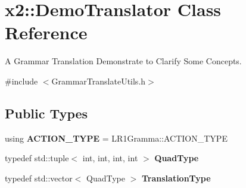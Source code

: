 \hypertarget{classx2_1_1_demo_translator}{}\section{x2\+:\+:Demo\+Translator Class Reference}
\label{classx2_1_1_demo_translator}


A Grammar Translation Demonstrate to Clarify Some Concepts.  




{\ttfamily \#include $<$Grammar\+Translate\+Utils.\+h$>$}

\subsection*{Public Types}
\begin{DoxyCompactItemize}
\item 
\mbox{\label{classx2_1_1_demo_translator_a353f41b11b2d282968ddde7f92c8844e}} 
using {\bfseries A\+C\+T\+I\+O\+N\+\_\+\+T\+Y\+PE} = L\+R1\+Gramma\+::\+A\+C\+T\+I\+O\+N\+\_\+\+T\+Y\+PE
\item 
\mbox{\label{classx2_1_1_demo_translator_aa08356e09fa72c26524568486fa70b42}} 
typedef std\+::tuple$<$ int, int, int, int $>$ {\bfseries Quad\+Type}
\item 
\mbox{\label{classx2_1_1_demo_translator_a2d71ca79ab44ac76063bc0cedb84fc5e}} 
typedef std\+::vector$<$ Quad\+Type $>$ {\bfseries Translation\+Type}
\end{DoxyCompactItemize}
